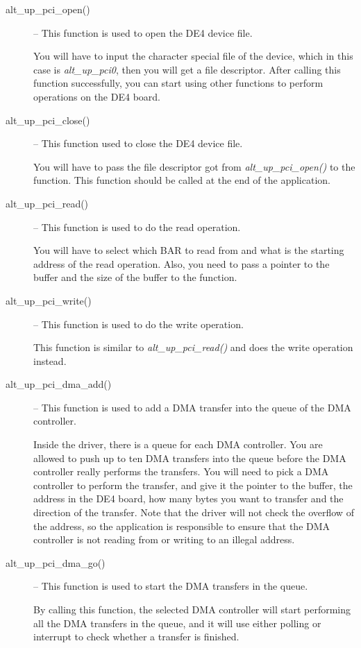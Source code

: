 \documentclass[11pt, twoside, pdftex]{article}
\begin{document}
\begin{description}
	\item[alt\_up\_pci\_open()] -- This function is used to open the DE4 device file. 
	
	You will have to input the character special file of the device, which in this case is {\it alt\_up\_pci0}, then you will get a file descriptor. After calling this function successfully, you can start using other functions to perform operations on the DE4 board. 
	
	\item[alt\_up\_pci\_close()] -- This function used to close the DE4 device file.
	
	You will have to pass the file descriptor got from {\it alt\_up\_pci\_open()} to the function. This function should be called at the end of the application.  
	
	\item[alt\_up\_pci\_read()] -- This function is used to do the read operation. 
	
	You will have to select which BAR to read from and what is the starting address of the read operation. Also, you need to pass a pointer to the buffer and the size of the buffer to the function.
	
	\item[alt\_up\_pci\_write()] -- This function is used to do the write operation.
	
	This function is similar to {\it alt\_up\_pci\_read()} and does the write operation instead.
	
	\item[alt\_up\_pci\_dma\_add()] -- This function is used to add a DMA transfer into the queue of the DMA controller.
	
	Inside the driver, there is a queue for each DMA controller. You are allowed to push up to ten DMA transfers into the queue before the DMA controller really performs the transfers. You will need to pick a DMA controller to perform the transfer, and give it the pointer to the buffer, the address in the DE4 board, how many bytes you want to transfer and the direction of the transfer. Note that the driver will not check the overflow of the address, so the application is responsible to ensure that the DMA controller is not reading from or writing to an illegal address.	
	
	\item[alt\_up\_pci\_dma\_go()] -- This function is used to start the DMA transfers in the queue.
	
	By calling this function, the selected DMA controller will start performing all the DMA transfers in the queue, and it will use either polling or interrupt to check whether a transfer is finished. 
	
\end{description}
\end{document}
